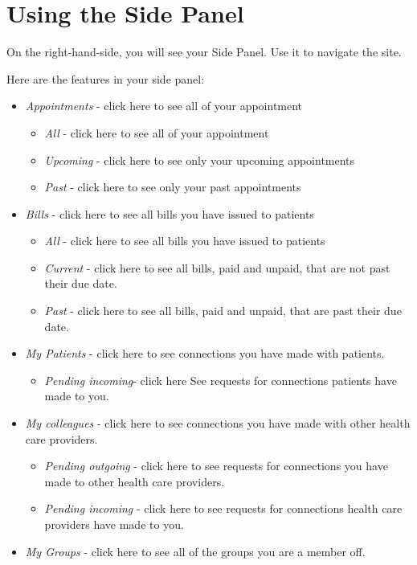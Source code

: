 \section{Using the Side Panel}
On the right-hand-side, you will see your Side Panel. Use it to navigate the site.

Here are the features in your side panel:
\begin{itemize}
\item \textit{Appointments} - click here to see all of your appointment
\begin{itemize}
\item \textit{All} - click here to see all of your appointment
\item \textit{Upcoming} - click here to see only your upcoming appointments
\item \textit{Past} - click here to see only your past appointments
\end{itemize}
\item \textit{Bills} - click here to see all bills you have issued to patients
\begin{itemize} 
\item \textit{All} - click here to see all bills you have issued to patients
\item \textit{Current} - click here to see all bills, paid and unpaid, that are not past their due date.
\item \textit{Past}  - click here to see all bills, paid and unpaid, that are past their due date.
\end{itemize}
\item \textit{My Patients} - click here to see connections you have made with patients.
\begin{itemize}
\item \textit{Pending incoming}- click here See requests for connections patients have made to you.
\end{itemize}
\item \textit{My colleagues} - click here to see connections you have made with other health care providers.
\begin{itemize}
\item \textit{Pending outgoing} - click here to see requests for connections you have made to other health care providers.
\item \textit{Pending incoming} - click here to see requests for connections health care providers have made to you.
\end{itemize}
\item \textit{My Groups} - click here to see all of the groups you are a member off.

\end{itemize}
